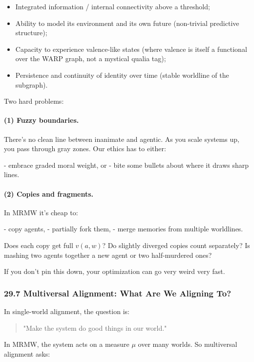 \begin{itemize}
  \item Integrated information / internal connectivity above a threshold;
  \item Ability to model its environment and its own future (non-trivial predictive structure);
  \item Capacity to experience valence-like states (where valence is itself a functional over the WARP graph, not a mystical qualia tag);
  \item Persistence and continuity of identity over time (stable worldline of the subgraph).
\end{itemize}

Two hard problems:

\paragraph{(1) Fuzzy boundaries.} There’s no clean line between inanimate and agentic. As you scale systems up, you pass through gray zones. Our ethics has to either:

- embrace graded moral weight, or
- bite some bullets about where it draws sharp lines.

\paragraph{(2) Copies and fragments.} In MRMW it’s cheap to:

- copy agents,
- partially fork them,
- merge memories from multiple worldlines.

Does each copy get full $v(a,w)$? Do slightly diverged copies count separately? Is mashing two agents together a new agent or two half-murdered ones?

If you don’t pin this down, your optimization can go very weird very fast.

\subsubsection*{29.7  Multiversal Alignment: What Are We Aligning To?}

In single-world alignment, the question is:

\begin{quote}
"Make the system do good things in our world."
\end{quote}

In MRMW, the system acts on a measure $\mu$ over many worlds.
So multiversal alignment asks:

